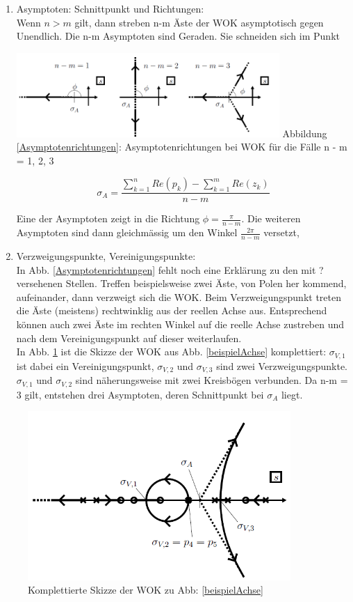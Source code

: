 \begin{enumerate}
\item Asymptoten: Schnittpunkt und Richtungen:\\
Wenn $n > m$ gilt, dann streben n-m Äste der WOK asymptotisch gegen
Unendlich. Die n-m Asymptoten sind Geraden. Sie schneiden sich im Punkt
\begin{multicols}{2}
		\includegraphics[width=10cm]{./images/asymptotenrichtunge.png}
Abbildung \ref{Asymptotenrichtungen}: Asymptotenrichtungen bei WOK für die Fälle n - m = 1, 2, 3
		\label{Asymptotenrichtungen}
\columnbreak
	\begin{flushright}
		\[\boxed{\sigma_A=\frac{\sum\limits_{k=1}^{n} Re(p_k)-\sum\limits_{k=1}^{m} Re(z_k)}{n-m}}\]
	\end{flushright}
\end{multicols}
Eine der Asymptoten zeigt in die Richtung $\phi = \frac{\pi}{n-m}$. Die weiteren Asymptoten
sind dann gleichmässig um den Winkel $\frac{2\pi}{n-m}$ versetzt,
\item Verzweigungspunkte, Vereinigungspunkte:\\
In Abb. \ref{Asymptotenrichtungen} fehlt noch eine Erklärung zu den mit ? versehenen Stellen. Treffen
beispielsweise zwei Äste, von Polen her kommend, aufeinander, dann verzweigt
sich die WOK. Beim Verzweigungspunkt treten die Äste (meistens) rechtwinklig
aus der reellen Achse aus. Entsprechend können auch zwei Äste im rechten
Winkel auf die reelle Achse zustreben und nach dem Vereinigungspunkt auf
dieser weiterlaufen.\\
In Abb. \ref{KomplettWOK} ist die Skizze der WOK aus Abb. \ref{beispielAchse}
komplettiert: $\sigma_{V,1}$ ist dabei ein Vereinigungspunkt, $\sigma_{V,2}$ und $\sigma_{V,3}$ sind zwei
Verzweigungspunkte. $\sigma_{V,1}$ und $\sigma_{V,2}$ sind näherungsweise mit zwei Kreisbögen
verbunden. Da n-m = 3 gilt, entstehen drei Asymptoten, deren Schnittpunkt
bei $\sigma_A$ liegt.
\end{enumerate}
\begin{figure}[h!]
\includegraphics[width=10cm]{./images/KomplettWOK.png}
\caption{Komplettierte Skizze der WOK zu Abb: \ref{beispielAchse}}
\label{KomplettWOK}
\end{figure}


